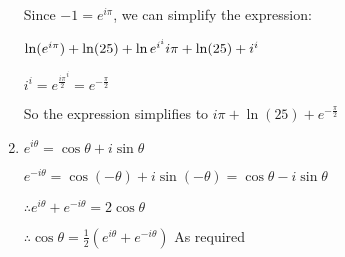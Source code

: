 \documentclass[../main.tex]{subfiles}
\begin{document}
\begin{spacing}{1.5}
\begin{enumerate}
    Since \(-1=e^{i \pi}\), we can simplify the expression:

    \(\ln(e^{i \pi})+\ln(25)+\ln{e^{i^{i}}}\\
    i \pi + \ln(25) + i^i\)

    \(i^i=e^{\frac{i \pi}{2}^{i}}=e^{-\frac{\pi}{2}}\)

    So the expression simplifies to \(i \pi + \ln(25) + e^{-\frac{\pi}{2}}\)
    
    \item 
    \(e^{i\theta}=\cos{\theta}+i\sin{\theta}\)

    \(e^{-i\theta}=\cos{(-\theta)}+i\sin{(-\theta)}=\cos{\theta}-i\sin{\theta}\)

    \(\therefore e^{i\theta}+e^{-i\theta}=2\cos{\theta}\)

    \(\therefore \cos{\theta}=\frac{1}{2}(e^{i\theta}+e^{-i\theta})\)
    As required

\end{enumerate}
\end{spacing}
\end{document}
